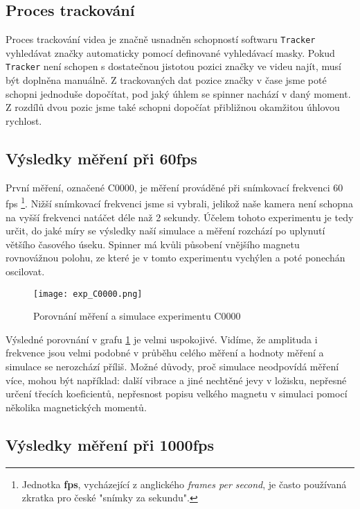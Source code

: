 \subsection{Proces trackování}

Proces trackování videa je značně usnadněn schopností softwaru \texttt{Tracker} vyhledávat značky automaticky pomocí definované vyhledávací masky. Pokud \texttt{Tracker} není schopen s dostatečnou jistotou pozici značky ve videu najít, musí být doplněna manuálně. Z trackovaných dat pozice značky v čase jsme poté schopni jednoduše dopočítat, pod jaký úhlem se spinner nachází v daný moment. Z rozdílů dvou pozic jsme také schopni dopočíat přibližnou okamžitou úhlovou rychlost.

\subsection{Výsledky měření při 60fps}

První měření, označené C0000, je měření prováděné při snímkovací frekvenci 60 fps \footnote{Jednotka \textbf{fps}, vycházející z anglického \textit{frames per second}, je často používaná zkratka pro české "snímky za sekundu".}.
Nižší snímkovací frekvenci jsme si vybrali, jelikož naše kamera není schopna na vyšší frekvenci natáčet déle naž 2 sekundy. Účelem tohoto experimentu je tedy určit, do jaké míry se výsledky naší simulace a měření rozchází po uplynutí většího časového úseku. Spinner má kvůli působení vnějšího magnetu rovnovážnou polohu, ze které je v tomto experimentu vychýlen a poté ponechán oscilovat.

\begin{figure}[!ht]
    \texttt{[image: exp\_C0000.png]}
    \centering
    \caption{Porovnání měření a simulace experimentu C0000}
    \label{fig:exp_C0000}
\end{figure}

Výsledné porovnání v grafu \ref{fig:exp_C0000} je velmi uspokojivé. Vidíme, že amplituda i frekvence jsou velmi podobné v průběhu celého měření a hodnoty měření a simulace se nerozchází příliš. Možné důvody, proč simulace neodpovídá měření více, mohou být například: další vibrace a jiné nechtěné jevy v ložisku, nepřesné určení třecích koeficientů, nepřesnost popisu velkého magnetu v simulaci pomocí několika magnetických momentů.

\clearpage

\subsection{Výsledky měření při 1000fps}

